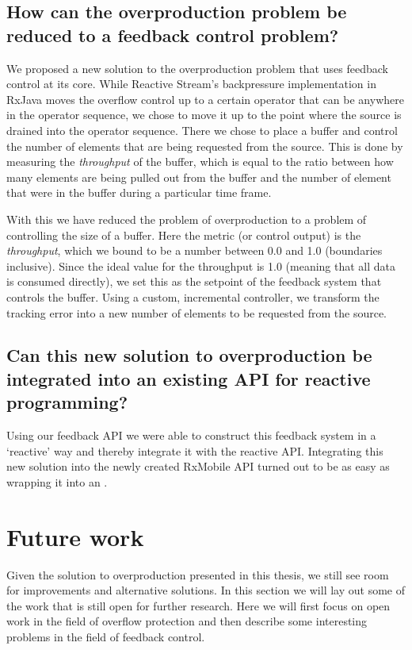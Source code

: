 \subsection*{How can the overproduction problem be reduced to a feedback control problem?}
We proposed a new solution to the overproduction problem that uses feedback control at its core. While Reactive Stream's backpressure implementation in RxJava moves the overflow control up to a certain operator that can be anywhere in the operator sequence, we chose to move it up to the point where the source is drained into the operator sequence. There we chose to place a buffer and control the number of elements that are being requested from the source. This is done by measuring the \textit{throughput} of the buffer, which is equal to the ratio between how many elements are being pulled out from the buffer and the number of element that were in the buffer during a particular time frame.

With this we have reduced the problem of overproduction to a problem of controlling the size of a buffer. Here the metric (or control output) is the \textit{throughput}, which we bound to be a number between 0.0 and 1.0 (boundaries inclusive). Since the ideal value for the throughput is 1.0 (meaning that all data is consumed directly), we set this as the setpoint of the feedback system that controls the buffer. Using a custom, incremental controller, we transform the tracking error into a new number of elements to be requested from the source.

\subsection*{Can this new solution to overproduction be integrated into an existing API for reactive programming?}
Using our feedback API we were able to construct this feedback system in a `reactive' way and thereby integrate it with the reactive API. Integrating this new solution into the newly created RxMobile API turned out to be as easy as wrapping it into an . 

\section{Future work}
Given the solution to overproduction presented in this thesis, we still see room for improvements and alternative solutions. In this section we will lay out some of the work that is still open for further research. Here we will first focus on open work in the field of overflow protection and then describe some interesting problems in the field of feedback control.

